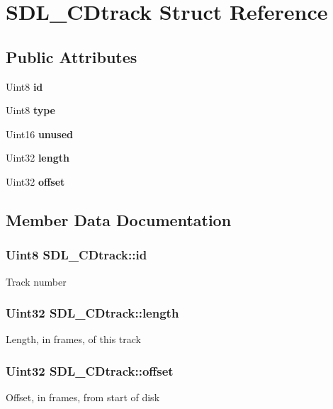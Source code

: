 \section{S\+D\+L\+\_\+\+C\+Dtrack Struct Reference}
\label{struct_s_d_l___c_dtrack}
\subsection*{Public Attributes}
\begin{DoxyCompactItemize}
\item 
Uint8 {\bf id}
\item 
Uint8 {\bf type}
\item 
Uint16 {\bfseries unused}\label{struct_s_d_l___c_dtrack_a2ec24a93792ff7a537f7554a89d596cf}

\item 
Uint32 {\bf length}
\item 
Uint32 {\bf offset}
\end{DoxyCompactItemize}


\subsection{Member Data Documentation}
\subsubsection[{id}]{\setlength{\rightskip}{0pt plus 5cm}Uint8 S\+D\+L\+\_\+\+C\+Dtrack\+::id}\label{struct_s_d_l___c_dtrack_aee8f951ef762bef0ab46e7424ad6c6a4}
Track number 
\subsubsection[{length}]{\setlength{\rightskip}{0pt plus 5cm}Uint32 S\+D\+L\+\_\+\+C\+Dtrack\+::length}\label{struct_s_d_l___c_dtrack_a15ae81e65a360c3a334e4323af6f2da5}
Length, in frames, of this track 
\subsubsection[{offset}]{\setlength{\rightskip}{0pt plus 5cm}Uint32 S\+D\+L\+\_\+\+C\+Dtrack\+::offset}\label{struct_s_d_l___c_dtrack_a5c0875650889c529cefee6c2684901f5}
Offset, in frames, from start of disk 
